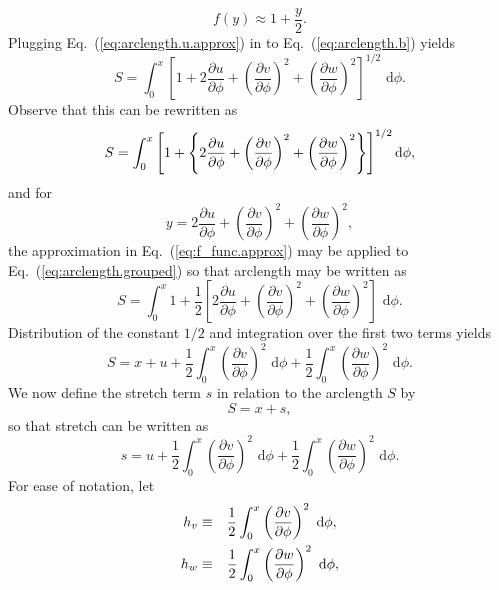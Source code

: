 \begin{equation}
f(y) \approx 1+\frac{y}{2}.
\label{eq:f_func.approx}
\end{equation}
Plugging Eq.~(\ref{eq:arclength.u.approx}) in to Eq.~(\ref{eq:arclength.b}) yields
\begin{equation}
S = \int_0^x \left[1+2\frac{\partial u}{\partial\phi}+\left(\frac{\partial v}{\partial\phi}\right)^2+\left(\frac{\partial w}{\partial\phi}\right)^2\right]^{1/2} \text{ d}\phi.
\end{equation}
Observe that this can be rewritten as 
\begin{equation}
S = \int_0^x \left[1+\left\lbrace 2\frac{\partial u}{\partial\phi}+\left(\frac{\partial v}{\partial\phi}\right)^2+\left(\frac{\partial w}{\partial\phi}\right)^2\right\rbrace\right]^{1/2} \text d\phi,
\label{eq:arclength.grouped}
\end{equation}
and for 
\begin{equation}
y = 2\frac{\partial u}{\partial\phi}+\left(\frac{\partial v}{\partial\phi}\right)^2+\left(\frac{\partial w}{\partial\phi}\right)^2,
\end{equation}
the approximation in Eq.~(\ref{eq:f_func.approx}) may be applied to Eq.~(\ref{eq:arclength.grouped}) so that arclength may be written as
\begin{equation}
S = \int_0^x 1+\frac{1}{2}\left[ 2\frac{\partial u}{\partial\phi}+\left(\frac{\partial v}{\partial\phi}\right)^2+\left(\frac{\partial w}{\partial\phi}\right)^2 \right]\text{ d}\phi.
\end{equation}
Distribution of the constant $1/2$ and integration over the first two terms yields
\begin{equation}
S = x + u + \frac{1}{2}\int_0^x\left(\frac{\partial v}{\partial\phi}\right)^2\text{ d}\phi+\frac{1}{2}\int_0^x\left(\frac{\partial w}{\partial\phi}\right)^2\text{ d}\phi.
\end{equation}
We now define the stretch term $s$ in relation to the arclength $S$ by
\begin{equation}
S = x+s,
\end{equation}
so that stretch can be written as
\begin{equation}
s = u + \frac{1}{2}\int_0^x\left(\frac{\partial v}{\partial\phi}\right)^2\text{ d}\phi+\frac{1}{2}\int_0^x\left(\frac{\partial w}{\partial\phi}\right)^2\text{ d}\phi.
\end{equation}
For ease of notation, let
\begin{eqnarray}
h_v &\equiv& \frac{1}{2}\int_0^x\left(\frac{\partial v}{\partial\phi}\right)^2\text{ d}\phi,{\vrule width 0in depth .1in}\\
h_w &\equiv& \frac{1}{2}\int_0^x\left(\frac{\partial w}{\partial\phi}\right)^2\text{ d}\phi,
\end{eqnarray}
